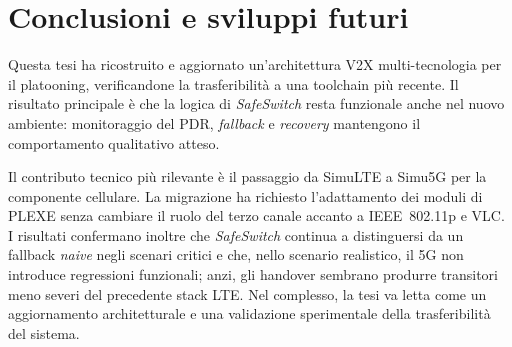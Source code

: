 \chapter{Conclusioni e sviluppi futuri}
\label{ch:conclusions}

Questa tesi ha ricostruito e aggiornato un'architettura V2X multi-tecnologia per il platooning, verificandone la trasferibilità a una toolchain più recente. Il risultato principale è che la logica di \emph{SafeSwitch} resta funzionale anche nel nuovo ambiente: monitoraggio del PDR, \emph{fallback} e \emph{recovery} mantengono il comportamento qualitativo atteso.

Il contributo tecnico più rilevante è il passaggio da SimuLTE a Simu5G per la componente cellulare. La migrazione ha richiesto l'adattamento dei moduli di PLEXE senza cambiare il ruolo del terzo canale accanto a IEEE~802.11p e VLC. I risultati confermano inoltre che \emph{SafeSwitch} continua a distinguersi da un fallback \emph{naive} negli scenari critici e che, nello scenario realistico, il 5G non introduce regressioni funzionali; anzi, gli handover sembrano produrre transitori meno severi del precedente stack LTE. Nel complesso, la tesi va letta come un aggiornamento architetturale e una validazione sperimentale della trasferibilità del sistema.




